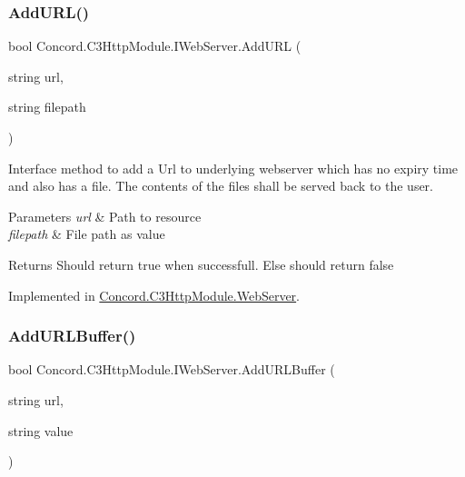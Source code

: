 \subsubsection{\texorpdfstring{AddURL()}{AddURL()}}
{\footnotesize\ttfamily bool Concord.\+C3\+Http\+Module.\+I\+Web\+Server.\+Add\+U\+RL (\begin{DoxyParamCaption}\item[{string}]{url,  }\item[{string}]{filepath }\end{DoxyParamCaption})}



Interface method to add a Url to underlying webserver which has no expiry time and also has a file. The contents of the files shall be served back to the user. 


\begin{DoxyParams}{Parameters}
{\em url} & Path to resource\\
\hline
{\em filepath} & File path as value\\
\hline
\end{DoxyParams}
\begin{DoxyReturn}{Returns}
Should return true when successfull. Else should return false
\end{DoxyReturn}


Implemented in \mbox{\hyperlink{class_concord_1_1_c3_http_module_1_1_web_server_ad44fcb4fc6cac61ba3af5bbe28d79132}{Concord.\+C3\+Http\+Module.\+Web\+Server}}.

\mbox{\label{interface_concord_1_1_c3_http_module_1_1_i_web_server_a9a176bd109854beffd146dfef15a276a}} 
\subsubsection{\texorpdfstring{AddURLBuffer()}{AddURLBuffer()}}
{\footnotesize\ttfamily bool Concord.\+C3\+Http\+Module.\+I\+Web\+Server.\+Add\+U\+R\+L\+Buffer (\begin{DoxyParamCaption}\item[{string}]{url,  }\item[{string}]{value }\end{DoxyParamCaption})}



